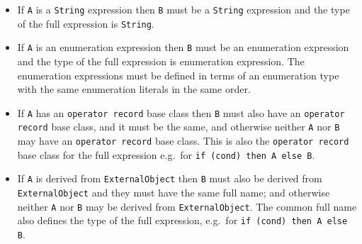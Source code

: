 \begin{itemize}
\item
  If \lstinline!A! is a \lstinline!String! expression then \lstinline!B! must be a \lstinline!String! expression and the type of the full expression  is \lstinline!String!.
\item
  If \lstinline!A! is an enumeration expression then \lstinline!B! must be an enumeration expression and the type of the full expression is enumeration expression.
  The enumeration expressions must be defined in terms of an enumeration type with the same enumeration literals in the same order.
\item
  If \lstinline!A! has an \lstinline!operator record! base class then \lstinline!B! must also have an \lstinline!operator record! base class, and it must be the same, and otherwise neither \lstinline!A! nor \lstinline!B! may have an \lstinline!operator record! base class.
  This is also the \lstinline!operator record! base class for the full expression e.g.\ for \lstinline!if (cond) then A else B!.
\item
  If \lstinline!A! is derived from \lstinline!ExternalObject! then \lstinline!B! must also be derived from \lstinline!ExternalObject! and they must have the same full name; and otherwise neither \lstinline!A! nor \lstinline!B! may be derived from \lstinline!ExternalObject!.
  The common full name also defines the type of the full expression, e.g.\ for \lstinline!if (cond) then A else B!.
\end{itemize}
